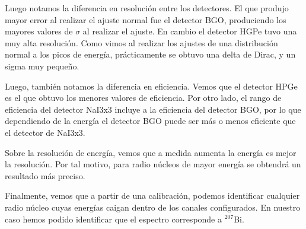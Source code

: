 \documentclass[a4paper, onecolumn]{article}
\begin{document}
		Luego notamos la diferencia en resolución entre los detectores. El que produjo mayor error al realizar el ajuste normal fue el detector BGO, produciendo los mayores valores de $\sigma$ al realizar el ajuste. En cambio el detector HGPe tuvo una muy alta resolución. Como vimos al realizar los ajustes de una distribución normal a los picos de energía, prácticamente se obtuvo una delta de Dirac, y un sigma muy pequeño.

		Luego, también notamos la diferencia en eficiencia. Vemos que el detector HPGe es el que obtuvo los menores valores de eficiencia. Por otro lado, el rango de eficiencia del detector NaI3x3 incluye a la eficiencia del detector BGO, por lo que dependiendo de la energía el detector BGO puede ser más o menos eficiente que el detector de NaI3x3.

		Sobre la resolución de energía, vemos que a medida aumenta la energía es mejor la resolución. Por tal motivo, para radio núcleos de mayor energía se obtendrá un resultado más preciso.

		Finalmente, vemos que a partir de una calibración, podemos identificar cualquier radio núcleo cuyas energías caigan dentro de los canales configurados. En nuestro caso hemos podido identificar que el espectro corresponde a ${}^{207}$Bi.
	
	
\end{document}
